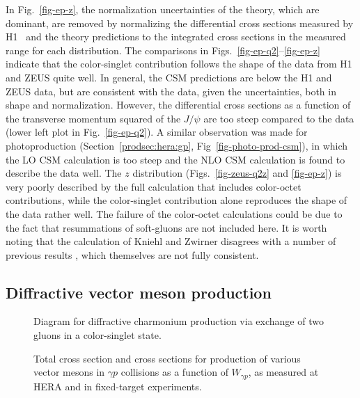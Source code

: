 In Fig.~\ref{fig-ep-z}, the normalization uncertainties of the
theory, which are dominant, are removed 
by normalizing the differential
cross sections measured by H1~\cite{Adloff:2002ey} and the
theory predictions to the integrated 
cross sections in the measured range for each distribution.
The comparisons in Figs.~\ref{fig-ep-q2}--\ref{fig-ep-z} 
indicate that the color-singlet contribution
follows the shape of the data from H1 and ZEUS quite well.
In general, the CSM predictions are below the H1
and ZEUS data, but are consistent with the data, given the 
uncertainties, both in shape and normalization.
However, the differential cross sections as a function
of the transverse momentum squared of the $J/\psi$ are too 
steep compared to the data (lower left plot in Fig.~\ref{fig-ep-q2}). 
A similar observation
was made for photoproduction (Section~\ref{prodsec:hera:gp},
Fig~\ref{fig-photo-prod-csm}), in which the LO CSM calculation is too
steep and the NLO CSM calculation is found to describe the data
well.
The $z$ distribution (Figs.~\ref{fig-zeus-q2z} and \ref{fig-ep-z})
is very poorly described by the full calculation that includes
color-octet contributions, while the color-singlet contribution
alone reproduces the shape of the data rather well.
The failure of the 
color-octet calculations could be due to the fact that resummations
of soft-gluons are not included here.
It is worth noting that the calculation of Kniehl and Zwirner
disagrees with a number of previous results
\cite{Korner:1982fm,Guillet:1987xr,Merabet:sm,Krucker:1995uz,Yuan:2000cn}, 
which themselves are not fully consistent.


\subsection{Diffractive vector meson production}
\label{subsechera:diffjpsi}

\begin{figure}
\begin{center}
\end{center}
\caption{Diagram for diffractive charmonium production via exchange of two gluons
 in a color-singlet state.}
\label{fig-ep-feyn-diff}
\end{figure}

\begin{figure}
\caption{Total cross section and cross sections for production of 
various vector mesons in $\gamma p$ collisions as a function of 
$W_{\gamma p}$, as measured at HERA and in fixed-target experiments.}
%
\label{fig-gp-vmdiffractive}
\end{figure}

